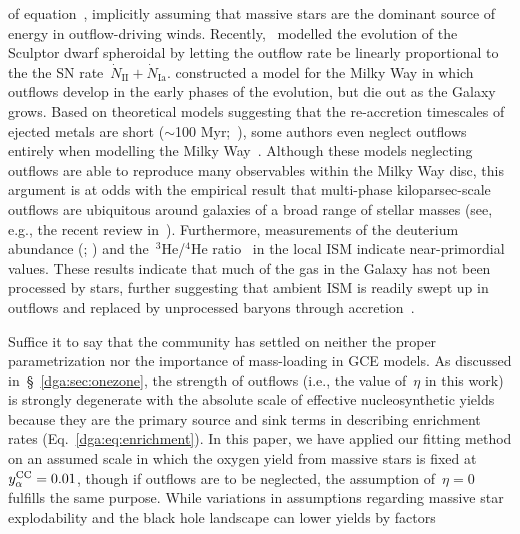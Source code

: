 \documentclass[main.tex]{subfiles}
\begin{document}
of equation~, implicitly assuming that massive stars are
the dominant source of energy in outflow-driving winds.
Recently,~\citet{delosReyes2022} modelled the evolution of the Sculptor dwarf
spheroidal by letting the outflow rate be linearly proportional to the the
SN rate~$\dot{N}_\text{II} + \dot{N}_\text{Ia}$.
\citet*{Kobayashi2020} constructed a model for the Milky Way in which
outflows develop in the early phases of the evolution, but die out as the
Galaxy grows.
Based on theoretical models suggesting that the re-accretion timescales of
ejected metals are short ($\sim$100 Myr;~\citealp{Melioli2008, Melioli2009,
Spitoni2008, Spitoni2009}), some authors even neglect outflows entirely when
modelling the Milky Way~\citep[e.g.,][]{Minchev2013, Minchev2014, Minchev2017,
Spitoni2019, Spitoni2021}.
Although these models neglecting outflows are able to reproduce many
observables within the Milky Way disc, this argument is at odds with the
empirical result that multi-phase kiloparsec-scale outflows are ubiquitous
around galaxies of a broad range of stellar masses (see, e.g., the recent
review in~\citealt{Veilleux2020}).
Furthermore, measurements of the deuterium abundance (\citealp{Linsky2006};
\citealp*{Prodanovic2010}) and the~$^3$He/$^4$He ratio~\citep{Balser2018} in
the local ISM indicate near-primordial values.
These results indicate that much of the gas in the Galaxy has not been
processed by stars, further suggesting that ambient ISM is readily swept up in
outflows and replaced by unprocessed baryons through
accretion~\citep{Weinberg2017a, Cooke2022}.
\par
Suffice it to say that the community has settled on neither the proper
parametrization nor the importance of mass-loading in GCE models.
As discussed in~\S~\ref{dga:sec:onezone}, the strength of outflows (i.e., the value
of~$\eta$ in this work) is strongly degenerate with the absolute scale of
effective nucleosynthetic yields because they are the primary source and sink
terms in describing enrichment rates (Eq.~\ref{dga:eq:enrichment}).
In this paper, we have applied our fitting method on an assumed scale in which
the oxygen yield from massive stars is fixed at~$y_\alpha^\text{CC} = 0.01$, though if
outflows are to be neglected, the assumption of~$\eta = 0$ fulfills the same
purpose.
While variations in assumptions regarding massive star explodability and the
black hole landscape can lower yields by factors
\end{document}

